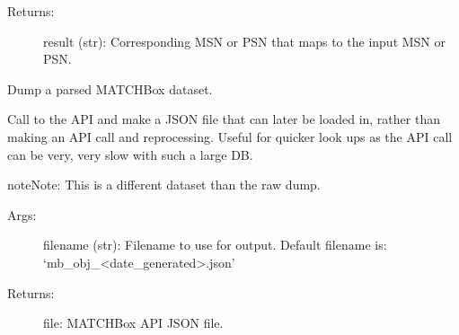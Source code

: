 \documentclass[letterpaper,10pt,english]{sphinxmanual}
\begin{document}
\begin{fulllineitems}
\begin{fulllineitems}
\begin{description}
\item[{Returns:}] \leavevmode
result (str): Corresponding MSN or PSN that maps to the input MSN or PSN.

\end{description}

\begin{sphinxVerbatim}[commandchars=\\\{\}]
\end{sphinxVerbatim}

\end{fulllineitems}


\begin{fulllineitems}
\label{\detokenize{matchbox_api_utils:matchbox_api_utils.MatchData.matchbox_dump}}
Dump a parsed MATCHBox dataset.

Call to the API and make a JSON file that can later be loaded in, rather
than making an API call and reprocessing. Useful for quicker look ups as
the API call can be very, very slow with such a large DB.

\begin{sphinxadmonition}{note}{Note:}
This is a different dataset than the raw dump.
\end{sphinxadmonition}
\begin{description}
\item[{Args:}] \leavevmode
filename (str): Filename to use for output. Default filename is:
‘mb\_obj\_\textless{}date\_generated\textgreater{}.json’

\item[{Returns:}] \leavevmode
file: MATCHBox API JSON file.

\end{description}

\end{fulllineitems}


\end{fulllineitems}

\end{document}
